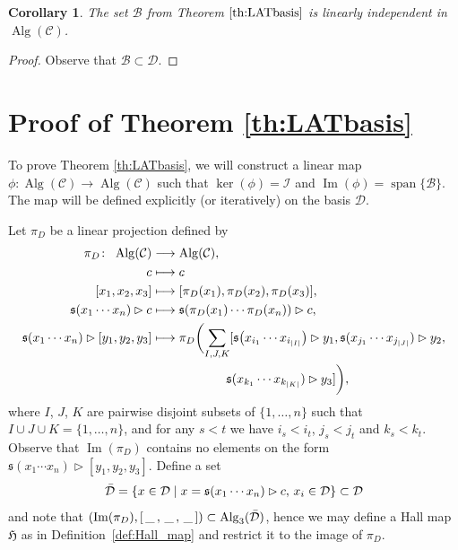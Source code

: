 \documentclass[10pt,a4paper]{amsart}
\newcommand{\Img}{\operatorname{Im}}
\newcommand*{\Alg}{\operatorname{Alg}}
\newcommand{\spn}{\operatorname{span}}
\newcommand{\I}{\mathcal{I}}
\newcommand{\noarg}{\,\_\,}
\numberwithin{equation}{section}
\newtheorem{Corollary}[Theorem]{Corollary}
\begin{document}
\begin{Corollary}\label{cor:B_lin_ind}
 The set $\mathcal{B}$ from Theorem $\ref{th:LATbasis}$ is linearly independent in $\Alg(\mathcal{C})$.
\end{Corollary}

\begin{proof}
 Observe that $\mathcal{B} \subset \mathcal{D}$.
\end{proof}


\section{Proof of Theorem \ref{th:LATbasis}}\label{sec:proof}

To prove Theorem \ref{th:LATbasis}, we will construct a linear map $\phi \colon \Alg(\mathcal{C}) \rightarrow \Alg(\mathcal{C})$ such that $\ker(\phi) = \I$ and $\Img(\phi)= \spn\{\mathcal{B}\}$. The map will be defined explicitly (or iteratively) on the basis $\mathcal{D}$.

Let $\pi_D$ be a linear projection defined by
\begin{align*}
 \pi_D \colon \ \Alg(\mathcal{C}) &\longrightarrow \Alg(\mathcal{C}), \\
 c & \longmapsto c \\ %
 [x_1, x_2 ,x_3] &\longmapsto [\pi_D(x_1),\pi_D(x_2),\pi_D(x_3)], \\
 \mathfrak{s}(x_1 \cdots x_n) \rhd c &\longmapsto \mathfrak{s}(\pi_D(x_1) \cdots \pi_D(x_n)) \rhd c , \\
 \mathfrak{s}(x_1 \cdots x_n) \rhd [y_1, y_2, y_3] &\longmapsto \pi_D \biggl( \sum_{I,J,K} [\mathfrak{s}\bigl(x_{i_1} \cdots x_{i_{|I|}}\bigr) \rhd y_1, \mathfrak{s}(x_{j_1} \cdots x_{j_{|J|}}) \rhd y_2,\\
 & \hphantom{\longmapsto \pi_D \biggl( \sum_{I,J,K}} \mathfrak{s}(x_{k_1} \cdots x_{k_{|K|}}) \rhd y_3] \biggr),
\end{align*}
where $I$, $J$, $K$ are pairwise disjoint subsets of $\{1, \dots , n\}$ such that $I \cup J \cup K = \{1, \dots , n \}$, and for any $s < t$ we have $i_s < i_t$, $j_s < j_t$ and $k_s < k_t$. Observe that $\Img(\pi_D)$ contains no elements on the form $\mathfrak{s}(x_1 \cdots x_n) \rhd [y_1,y_2,y_3]$. Define a set
\[
\Bar{\mathcal{D}} = \{ x \in \mathcal{D} \mid x = \mathfrak{s}(x_1 \cdots x_n) \rhd c , \, x_i \in \mathcal{D} \} \subset \mathcal{D}
\]
and note that $(\Img(\pi_D), [\noarg,\noarg,\noarg]) \subset \Alg_3(\Bar{\mathcal{D}})$, hence we may define a Hall map $\mathfrak{H}$ as in Definition~\ref{def:Hall_map} and restrict it to the image of $\pi_D$.
\end{document}
